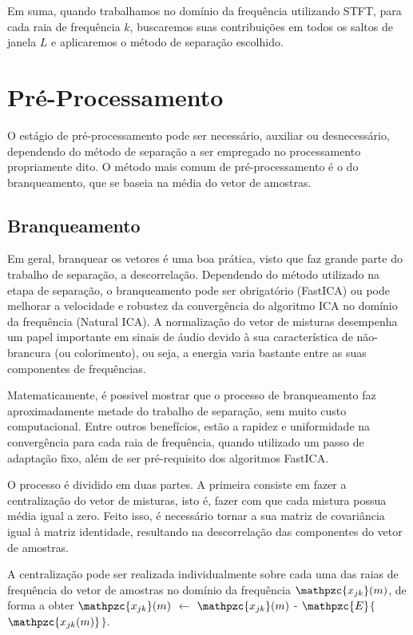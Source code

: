         Em suma, quando trabalhamos no domínio da frequência utilizando STFT, para cada raia de frequência $k$, buscaremos suas contribuições em todos os saltos de janela $L$ e aplicaremos o método de separação escolhido.
        
\section{Pré-Processamento}
        O estágio de pré-processamento pode ser necessário, auxiliar ou desnecessário, dependendo do método de separação a ser empregado no processamento propriamente dito. O método mais comum de pré-processamento é o do branqueamento, que se baseia na média do vetor de amostras.
    
    \subsection{Branqueamento} \label{sec:whitening}
        Em geral, branquear os vetores é uma boa prática, visto que faz grande parte do trabalho de separação, a descorrelação. Dependendo do método utilizado na etapa de separação, o branqueamento pode ser obrigatório (FastICA) ou pode melhorar a velocidade e robustez da convergência do algoritmo ICA no domínio da frequência (Natural ICA). A normalização do vetor de misturas desempenha um papel importante em sinais de áudio devido à sua característica de não-brancura (ou colorimento), ou seja, a energia varia bastante entre as suas componentes de frequências.
        
        Matematicamente, é possivel mostrar que o processo de branqueamento faz aproximadamente metade do trabalho de separação, sem muito custo computacional. Entre outros benefícios, estão a rapidez e uniformidade na convergência para cada raia de frequência, quando utilizado um passo de adaptação fixo, além de ser pré-requisito dos algoritmos FastICA.
        
        O processo é dividido em duas partes. A primeira consiste em fazer a centralização do vetor de misturas, isto é, fazer com que cada mistura possua média igual a zero. Feito isso, é necessário tornar a sua matriz de covariância igual à matriz identidade, resultando na descorrelação das componentes do vetor de amostras.
        
        A centralização pode ser realizada individualmente sobre cada uma das raias de frequência do vetor de amostras no domínio da frequência $\mathpzc{x_{jk}}(m)$, de forma a obter $\mathpzc{x_{jk}}(m)$ $\leftarrow$ $\mathpzc{x_{jk}}(m)$ - $\mathpzc{E}$$\{$$\mathpzc{x_{jk}(m)}$$\}$.
        

